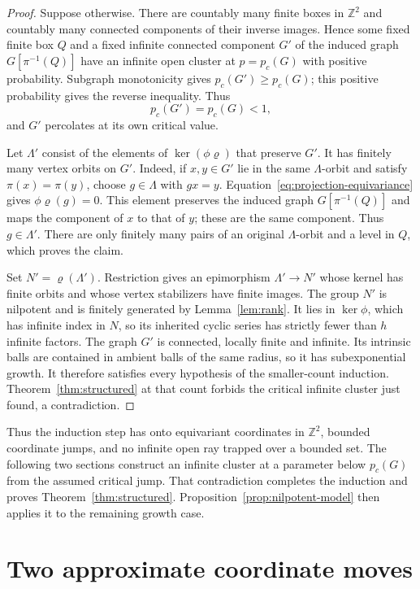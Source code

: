 \documentclass[11pt]{article}
\theoremstyle{definition}
\newcommand{\pc}{p_c}
\begin{document}
\begin{proof}
Suppose otherwise. There are countably many finite boxes in
$\mathbb Z^2$ and countably many connected components of their inverse
images. Hence some fixed finite box $Q$ and a fixed infinite connected
component $G'$ of the induced graph $G[\pi^{-1}(Q)]$ have an infinite
open cluster at $p=\pc(G)$ with positive probability. Subgraph
monotonicity gives $\pc(G')\ge\pc(G)$; this positive probability
gives the reverse inequality. Thus
\[
 \pc(G')=\pc(G)<1,
\]
and $G'$ percolates at its own critical value.

Let $\Lambda'$ consist of the elements of $\ker(\phi\varrho)$ that
preserve $G'$. It has finitely many vertex orbits on $G'$. Indeed,
if $x,y\in G'$ lie in the same $\Lambda$-orbit and satisfy
$\pi(x)=\pi(y)$, choose $g\in\Lambda$ with $gx=y$.
Equation~\eqref{eq:projection-equivariance} gives
$\phi\varrho(g)=0$. This element preserves the induced graph
$G[\pi^{-1}(Q)]$ and maps the component of $x$ to that of $y$;
these are the same component. Thus $g\in\Lambda'$. There are only
finitely many pairs of an original $\Lambda$-orbit and a level in $Q$,
which proves the claim.

Set $N'=\varrho(\Lambda')$. Restriction gives an epimorphism
$\Lambda'\to N'$ whose kernel has finite orbits and whose vertex
stabilizers have finite images. The group $N'$ is nilpotent and is
finitely generated by Lemma~\ref{lem:rank}. It lies in $\ker\phi$,
which has infinite index in $N$, so its inherited cyclic series has
strictly fewer than $h$ infinite factors. The graph $G'$ is connected,
locally finite and infinite. Its intrinsic balls are contained in
ambient balls of the same radius, so it has subexponential growth.
It therefore satisfies every hypothesis of the smaller-count
induction. Theorem~\ref{thm:structured} at that count forbids the
critical infinite cluster just found, a contradiction.
\end{proof}

Thus the induction step has onto equivariant coordinates in
\(\mathbb Z^2\), bounded coordinate jumps, and no infinite open ray
trapped over a bounded set. The following two sections construct an
infinite cluster at a parameter below \(\pc(G)\) from the assumed
critical jump. That contradiction completes the induction and proves
Theorem~\ref{thm:structured}. Proposition~\ref{prop:nilpotent-model}
then applies it to the remaining growth case.

\section{Two approximate coordinate moves}\label{sec:moves}
\end{document}
